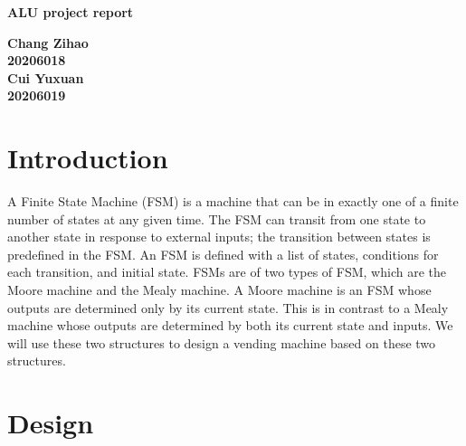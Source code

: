 \documentclass[12pt,a4paper]{article}
\begin{document}
\begin{titlepage}
  \begin{center}
    \vspace*{1cm}

    \textbf{\Huge ALU project report}

    \vspace{0.5cm}

         
    \vspace{1.5cm}

    \textbf{\large Chang Zihao \\20206018\\\large Cui Yuxuan\\20206019}

    \vfill
         

         
    \vspace{0.8cm}
  


         
\end{center}
\end{titlepage}


\newpage
\tableofcontents
\thispagestyle{empty}

\newpage
{}
\setcounter{page}{1}

\section{Introduction}

A Finite State Machine (FSM) is a machine that can be in exactly one of a finite number of states at any given time. 
The FSM can transit from one state to another state in response to external inputs; 
the transition between states is predefined in the FSM. 
An FSM is defined with a list of states, conditions for each transition, and initial state. 
FSMs are of two types of FSM, which are the Moore machine and the Mealy machine. 
A Moore machine is an FSM whose outputs are determined only by its current state. 
This is in contrast to a Mealy machine whose outputs are determined by both its current state and inputs. 
We will use these two structures to design a vending machine based on these two structures.

\newpage

\section{Design}
\end{document}
